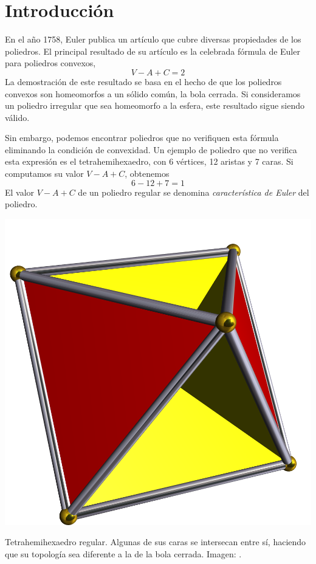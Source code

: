 \chapter*{Introducción}
En el año 1758, Euler publica un artículo que cubre diversas propiedades de
los poliedros. El principal resultado de su artículo es la celebrada fórmula
de Euler para poliedros convexos,
\[V-A+C=2\]
La demostración de este resultado se basa en el hecho de que los poliedros
convexos son homeomorfos a un sólido común, la bola cerrada. Si consideramos
un poliedro irregular que sea homeomorfo a la esfera, este resultado sigue
siendo válido.

Sin embargo, podemos encontrar poliedros que no verifiquen esta fórmula
eliminando la condición de convexidad. Un ejemplo de poliedro que no verifica
esta expresión es el tetrahemihexaedro, con 6 vértices, 12 aristas y 7 caras.
Si computamos su valor $V-A+C$, obtenemos
\[6-12+7=1\]
El valor $V-A+C$ de un poliedro regular se denomina \emph{característica de
Euler} del poliedro.

\begin{marginfigure}
\includegraphics{Figures/Tetrahemihexahedron.png}
\caption[Tetrahemihexaedro]{Tetrahemihexaedro regular. Algunas de sus caras se
intersecan entre sí, haciendo que su topología sea diferente a la de la bola
cerrada. Imagen: \cite{Tetra}.}
\end{marginfigure}

